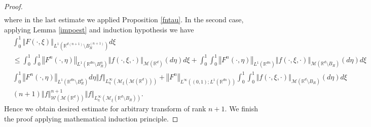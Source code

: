 \documentclass[10pt]{article}
\newcommand*{\norm}[1]{\left\Vert{#1}\right\Vert}
\newcommand{\R}{\mathbb{R}}
\newcommand{\izj}{\int_{0}^{1}}
\newcommand{\W}{\mathcal{W}}
\begin{document}
\begin{proof}
\begin{align*}
\end{align*}
where in the last estimate we applied Proposition \ref{fntau}.
In the second case, applying Lemma \ref{impoest} and induction hypothesis we have
\begin{align*}
    &\izj \norm{F(\cdot,\xi)}_{L^{1}(\R^{d(n+1)}\setminus B_R^{(n+1)})}d\xi \\
&\leq \izj \izj \norm{F^n(\cdot,\eta)}_{L^{1}(\R^{dn}\setminus B_R^{n})}\norm{f(\cdot,\xi,\cdot)}_{\mathcal{M}(\R^d)}(d\eta)d\xi + \izj \izj \norm{F^n(\cdot,\eta)}_{L^{1}(\R^{dn})}\norm{f(\cdot,\xi,\cdot)}_{\mathcal{M}(\R^d\setminus B_R)}(d\eta)d\xi \\
&\izj \norm{F^n(\cdot,\eta)}_{L^{1}(\R^{dn}\setminus B_R^{n})}d\eta \norm{f}_{L^{\infty}_\eta(\mathcal{M}_\xi(\mathcal{M}(\R^d))) } +
\norm{F^n}_{L^{\infty}((0,1);L^{1}(\R^{dn}))}\izj \izj \norm{f(\cdot,\xi,\cdot)}_{\mathcal{M}(\R^d\setminus B_R)}(d\eta)d\xi \\
&(n+1) \norm{f}_{\W(\mathcal{M}(\R^d))}^{n+1} \norm{f}_{L^{\infty}_\eta(\mathcal{M}_\xi(\R^d\setminus B_R))}.  
\end{align*}
Hence we obtain desired estimate for arbitrary transform of rank $n+1$. We finish the proof applying mathematical induction principle.  
\end{proof}
\end{document}
